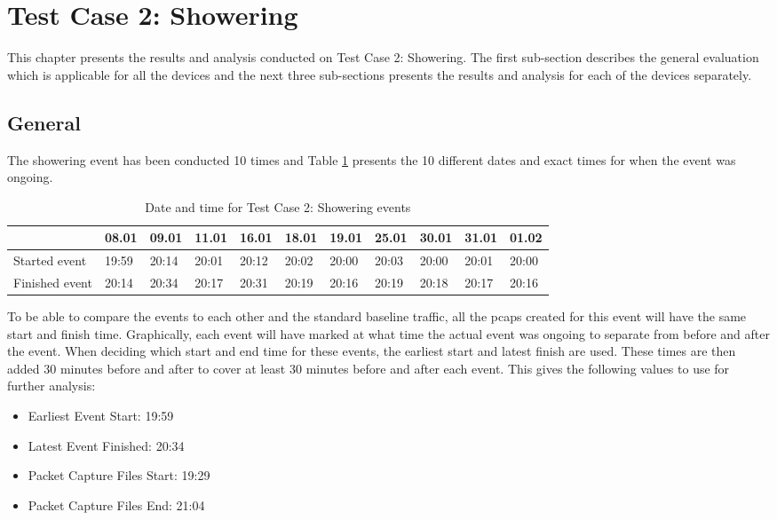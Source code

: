 \newpage
\section{Test Case 2: Showering}
This chapter presents the results and analysis conducted on Test Case 2: Showering. The first sub-section describes the general evaluation which is applicable for all the devices and the next three sub-sections presents the results and analysis for each of the devices separately. 
\subsection{General}
The showering event has been conducted 10 times and Table \ref{tab:ShoweringDates} presents the 10 different dates and exact times for when the event was ongoing.
\begin{table}[H]
    \centering
    \caption{Date and time for Test Case 2: Showering events}
    \begin{adjustbox}{width=1\textwidth} 
        \begin{tabular}{l|l|l|l|l|l|l|l|l|l|l|}
            \cline{2-11}
                & 08.01 & 09.01 & 11.01 & 16.01 & 18.01 & 19.01 & 25.01 & 30.01 & 31.01 & 01.02 \\ \hline
            \multicolumn{1}{|l|}{Started event}  & 19:59 & 20:14 & 20:01 & 20:12 & 20:02 & 20:00 & 20:03 & 20:00 & 20:01 & 20:00 \\ \hline
            \multicolumn{1}{|l|}{Finished event} & 20:14 & 20:34 & 20:17 & 20:31 & 20:19 & 20:16 & 20:19 & 20:18 & 20:17 & 20:16 \\ \hline
        \end{tabular}
    \end{adjustbox}
    \label{tab:ShoweringDates}
\end{table}

To be able to compare the events to each other and the standard baseline traffic, all the pcaps created for this event will have the same start and finish time. Graphically, each event will have marked at what time the actual event was ongoing to separate from before and after the event. When deciding which start and end time for these events, the earliest start and latest finish are used. These times are then added 30 minutes before and after to cover at least 30 minutes before and after each event. This gives the following values to use for further analysis:

\begin{itemize}
    \item Earliest Event Start: 19:59
    \item Latest Event Finished: 20:34
    \item Packet Capture Files Start: 19:29
    \item Packet Capture Files End: 21:04
\end{itemize}

